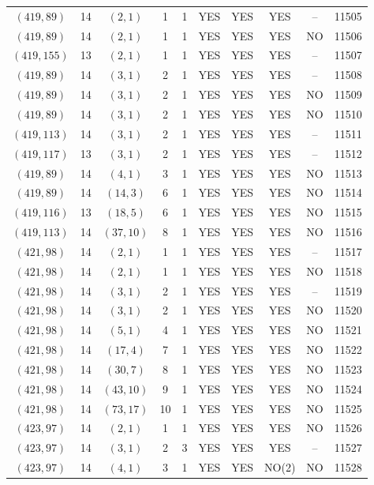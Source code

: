 \begin{longtable}{|c|c|c|c|c|c|c|c|c|c|}
$(419, 89)$ & 14 & $(2, 1)$ & 1 & 1 & YES & YES & YES & -- & 11505\\
$(419, 89)$ & 14 & $(2, 1)$ & 1 & 1 & YES & YES & YES & NO & 11506\\
$(419, 155)$ & 13 & $(2, 1)$ & 1 & 1 & YES & YES & YES & -- & 11507\\
$(419, 89)$ & 14 & $(3, 1)$ & 2 & 1 & YES & YES & YES & -- & 11508\\
$(419, 89)$ & 14 & $(3, 1)$ & 2 & 1 & YES & YES & YES & NO & 11509\\
$(419, 89)$ & 14 & $(3, 1)$ & 2 & 1 & YES & YES & YES & NO & 11510\\
$(419, 113)$ & 14 & $(3, 1)$ & 2 & 1 & YES & YES & YES & -- & 11511\\
$(419, 117)$ & 13 & $(3, 1)$ & 2 & 1 & YES & YES & YES & -- & 11512\\
$(419, 89)$ & 14 & $(4, 1)$ & 3 & 1 & YES & YES & YES & NO & 11513\\
$(419, 89)$ & 14 & $(14, 3)$ & 6 & 1 & YES & YES & YES & NO & 11514\\
$(419, 116)$ & 13 & $(18, 5)$ & 6 & 1 & YES & YES & YES & NO & 11515\\
$(419, 113)$ & 14 & $(37, 10)$ & 8 & 1 & YES & YES & YES & NO & 11516\\
$(421, 98)$ & 14 & $(2, 1)$ & 1 & 1 & YES & YES & YES & -- & 11517\\
$(421, 98)$ & 14 & $(2, 1)$ & 1 & 1 & YES & YES & YES & NO & 11518\\
$(421, 98)$ & 14 & $(3, 1)$ & 2 & 1 & YES & YES & YES & -- & 11519\\
$(421, 98)$ & 14 & $(3, 1)$ & 2 & 1 & YES & YES & YES & NO & 11520\\
$(421, 98)$ & 14 & $(5, 1)$ & 4 & 1 & YES & YES & YES & NO & 11521\\
$(421, 98)$ & 14 & $(17, 4)$ & 7 & 1 & YES & YES & YES & NO & 11522\\
$(421, 98)$ & 14 & $(30, 7)$ & 8 & 1 & YES & YES & YES & NO & 11523\\
$(421, 98)$ & 14 & $(43, 10)$ & 9 & 1 & YES & YES & YES & NO & 11524\\
$(421, 98)$ & 14 & $(73, 17)$ & 10 & 1 & YES & YES & YES & NO & 11525\\
$(423, 97)$ & 14 & $(2, 1)$ & 1 & 1 & YES & YES & YES & NO & 11526\\
$(423, 97)$ & 14 & $(3, 1)$ & 2 & 3 & YES & YES & YES & -- & 11527\\
$(423, 97)$ & 14 & $(4, 1)$ & 3 & 1 & YES & YES & NO(2) & NO & 11528\\

\end{longtable}
